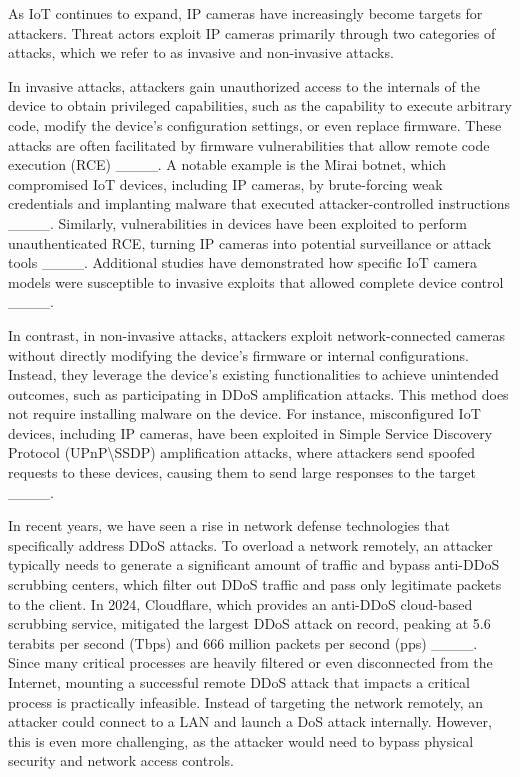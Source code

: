 As IoT continues to expand, IP cameras have increasingly become targets for attackers. Threat actors exploit IP cameras primarily through two categories of attacks, which we refer to as invasive and non-invasive attacks.

In invasive attacks, attackers gain unauthorized access to the internals of the device to obtain privileged capabilities, such as the capability to execute arbitrary code, modify the device’s configuration settings, or even replace firmware. These attacks are often facilitated by firmware vulnerabilities that allow remote code execution (RCE) ____. A notable example is the Mirai botnet, which compromised IoT devices, including IP cameras, by brute-forcing weak credentials and implanting malware that executed attacker-controlled instructions ____. 
Similarly, vulnerabilities in devices have been exploited to perform unauthenticated RCE, turning IP cameras into potential surveillance or attack tools ____. Additional studies have demonstrated how specific IoT camera models were susceptible to invasive exploits that allowed complete device control ____.

In contrast, in non-invasive attacks, attackers exploit network-connected cameras without directly modifying the device's firmware or internal configurations. Instead, they leverage the device's existing functionalities to achieve unintended outcomes, such as participating in DDoS amplification attacks. This method does not require installing malware on the device. For instance, misconfigured IoT devices, including IP cameras, have been exploited in Simple Service Discovery Protocol (UPnP\textbackslash SSDP) amplification attacks, where attackers send spoofed requests to these devices, causing them to send large responses to the target ____.


In recent years, we have seen a rise in network defense technologies that specifically address DDoS attacks. 
To overload a network remotely, an attacker typically needs to generate a significant amount of traffic and bypass anti-DDoS scrubbing centers, which filter out DDoS traffic and pass only legitimate packets to the client. In 2024, Cloudflare, which provides an anti-DDoS cloud-based scrubbing service, mitigated the largest DDoS attack on record, peaking at 5.6 terabits per second (Tbps) and 666 million packets per second (pps) ____. Since many critical processes are heavily filtered or even disconnected from the Internet, mounting a successful remote DDoS attack that impacts a critical process is practically infeasible.
Instead of targeting the network remotely, an attacker could connect to a LAN and launch a DoS attack internally. 
However, this is even more challenging, as the attacker would need to bypass physical security and network access controls.

